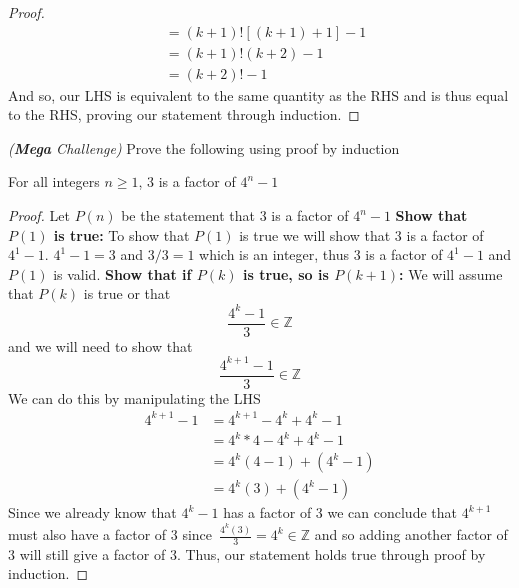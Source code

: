 \documentclass[addpoints]{exam}
\begin{document}
\begin{questions}
\begin{solution}[\stretch{1}]
\begin{proof}
\begin{align*}
				                                                  & = \left(k+1\right)\textbf{!}\left[\left(k+1\right) + 1\right] - 1 \tag{by factoring}                                                     \\
				                                                  & = \left(k+1\right)\textbf{!}\left(k+2\right) - 1                                                                                         \\
				                                                  & = \left(k+2\right)\textbf{!} - 1 \tag{by properties of factorials}
			\end{align*}
			And so, our LHS is equivalent to the same quantity as the RHS and is thus equal to the RHS, proving our statement through induction.
		\end{proof}
	\end{solution}
	\newpage
	\question \textit{(\textbf{Mega} Challenge)} Prove the following using proof by induction
	\begin{center}
		For all integers $n \geq 1$, $3$ is a factor of $4^n - 1$
	\end{center}
	\begin{solution}[\stretch{1}]
		\begin{proof}
			Let $P(n)$ be the statement that $3$ is a factor of $4^n - 1$
			\newline\textbf{Show that $P(1)$ is true:} To show that $P(1)$ is true we will show that $3$ is a factor of $4^1 - 1$. $4^1 - 1 = 3$ and $3/3 = 1$ which is an integer, thus $3$ is a factor of $4^1-1$ and $P(1)$ is valid.
			\newline\textbf{Show that if $P(k)$ is true, so is $P(k+1)$:} We will assume that $P(k)$ is true or that
			\[
				\frac{4^k-1}{3} \in \mathbb{Z}
			\]
			and we will need to show that
			\[
				\frac{4^{k+1}-1}{3} \in \mathbb{Z}
			\]
			We can do this by manipulating the LHS
			\begin{align*}
				4^{k+1} - 1 & = 4^{k+1} - 4^k + 4^k - 1 \\
				            & = 4^k * 4 - 4^k + 4^k - 1 \\
				            & = 4^k(4-1) + (4^k - 1)    \\
				            & = 4^k(3) + (4^k - 1)
			\end{align*}
			Since we already know that $4^k-1$ has a factor of $3$ we can conclude that $4^{k+1}$ must also have a factor of $3$ since $\displaystyle\, \frac{4^k(3)}{3} = 4^k \in \mathbb{Z}$ and so adding another factor of $3$ will still give a factor of $3$. Thus, our statement holds true through proof by induction.
		\end{proof}
	\end{solution}
\end{questions}
\end{document}
